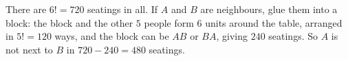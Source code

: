 There are $6!=720$ seatings in all. If $A$ and $B$ are neighbours, glue them into a block: the block and the other $5$ people form $6$ units around the table, arranged in $5!=120$ ways, and the block can be $AB$ or $BA$, giving $240$ seatings. So $A$ is not next to $B$ in $720-240=\boxed{480}$ seatings.

